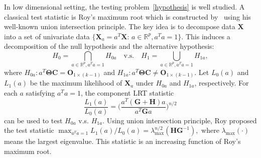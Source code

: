 \documentclass[12pt]{article} %
\newcommand{\bX}{\mathbf{X}}
\newcommand{\bH}{\mathbf{H}}
\newcommand{\bG}{\mathbf{G}}
\newcommand{\bC}{\mathbf{C}}
\newcommand{\bO}{\mathbf{O}}
\newcommand{\bfsym}[1]{\ensuremath{\boldsymbol{#1}}}
\def\bTheta {\bfsym {\Theta}}
\theoremstyle{definition}
\begin{document}
In low dimensional setting, the testing problem~\eqref{hypothesis} is well studied.
A classical test statistic is Roy's maximum root which is constructed by~\cite{Roy1953} using his well-known union intersection principle.
        The key idea is to decompose data $\bX$ into a set of univariate data $\{\bX_{a}=a^T \bX:\, a\in \mathbb{R}^p, a^T a=1\}$.
        This induces a decomposition of the null hypothesis and the alternative hypothesis:
        $$
        H_0=\bigcap_{a\in\mathbb{R}^p, a^T a=1} H_{0a} \quad \text{v.s.} \quad 
        H_1=\bigcup_{a\in\mathbb{R}^p, a^T a=1} H_{1a},
        $$
        where 
 $H_{0a}: a^T \bTheta \bC = \bO_{1\times (k-1)}$ and  $H_{1a} : a^T \bTheta \bC \neq \bO_{1\times (k-1)}$.
Let $L_0(a)$ and $L_1(a)$ be the maximum likelihood of $\bX_a$ under $H_{0a}$ and $H_{1a}$, respectively.
For each $a$ satisfying $a^T a=1$, the component LRT statistic
$$ \frac{L_1(a)}{L_0(a)}=\Big(\frac{a^T(\bG+\bH) a}{a^T \bG a}\Big)^{n/2}$$
can be used to test $H_{0a}$ v.s. $H_{1a}$. 
Using union intersection principle, Roy proposed the test statistic
$
\max_{a^T a=1}  {L_1(a)}/{L_0(a)}=\lambda_{\max}^{n/2}(\bH\bG^{-1}),
$
where $\lambda_{\max}(\cdot)$ means the largest eigenvalue.
This statistic is an increasing function of Roy's maximum root.
\end{document}
